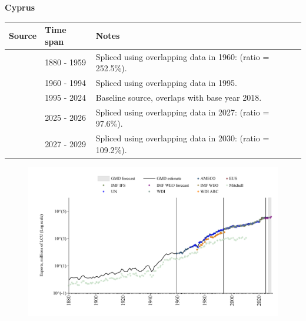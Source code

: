 \documentclass[12pt,a4paper,landscape]{article}
\begin{document}
\begin{adjustbox}{max totalsize={\paperwidth}{\paperheight},center}
\begin{minipage}[t][\textheight][t]{\textwidth}
\vspace*{0.5cm}
{}
\begin{center}
{\Large\bfseries Cyprus}
\end{center}
\vspace{0.5cm}
\begin{table}[H]
\centering
\small
\begin{tabular}{|l|l|l|}
\hline
\textbf{Source} & \textbf{Time span} & \textbf{Notes} \\
\hline
\rowcolor{white}\cite{Mitchell}& 1880 - 1959 &Spliced using overlapping data in 1960: (ratio = 252.5\%).\\
\rowcolor{lightgray}\cite{AMECO}& 1960 - 1994 &Spliced using overlapping data in 1995.\\
\rowcolor{white}\cite{EUS}& 1995 - 2024 &Baseline source, overlaps with base year 2018.\\
\rowcolor{lightgray}\cite{AMECO}& 2025 - 2026 &Spliced using overlapping data in 2027: (ratio = 97.6\%).\\
\rowcolor{white}\cite{IMF_WEO_forecast}& 2027 - 2029 &Spliced using overlapping data in 2030: (ratio = 109.2\%).\\
\hline
\end{tabular}
\end{table}
\begin{figure}[H]
\centering
\includegraphics[width=\textwidth,height=0.6\textheight,keepaspectratio]{graphs/CYP_exports.pdf}
\end{figure}
\end{minipage}
\end{adjustbox}
\end{document}

